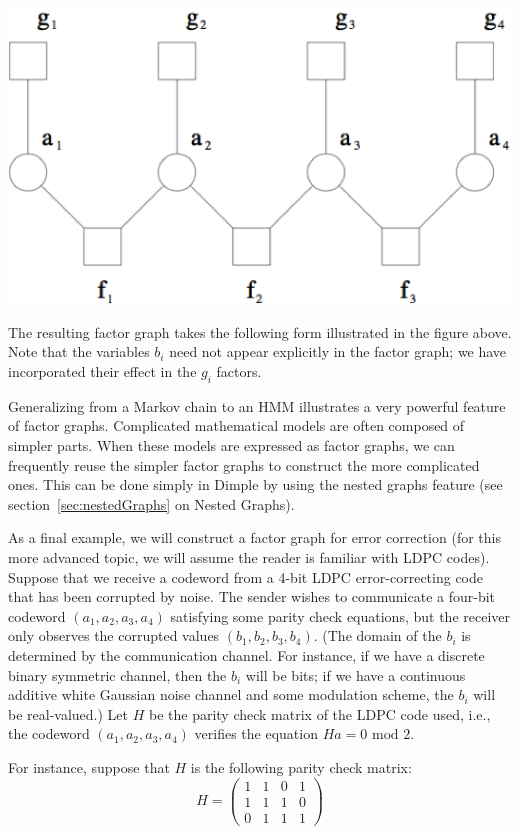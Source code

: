 \includegraphics{images/HMMExample.png}

The resulting factor graph takes the following form illustrated in the figure above. Note 
that the variables $b_i$  need not appear explicitly in the factor graph; we have incorporated their effect in the $g_i$  factors.

Generalizing from a Markov chain to an HMM illustrates a very powerful feature of factor graphs.  Complicated mathematical models are often composed of simpler parts.  When these models are expressed as factor graphs, we can frequently reuse the simpler factor graphs to construct the more complicated ones.  This can be done simply in Dimple by using the nested graphs feature (see section~\ref{sec:nestedGraphs} on Nested Graphs).

As a final example, we will construct a factor graph for error correction (for this
 more advanced topic, we will assume the reader is familiar with LDPC codes).  Suppose
 that we receive a codeword from a 4-bit LDPC error-correcting code that has been corrupted by noise.  
The sender wishes to communicate a four-bit codeword $(a_{1},a_{2},a_{3},a_{4})$ satisfying some parity check equations, 
but the receiver only observes the corrupted values $(b_{1},b_{2},b_{3},b_{4})$. (The domain of the $b_{i}$ is determined by the 
communication channel.  For instance, if we have a discrete binary symmetric channel, then the $b_{i}$ will be bits; 
if we have a continuous additive white Gaussian noise channel and some modulation scheme, the $b_{i}$  will be real-valued.) 
Let $H$ be the parity check matrix of the LDPC code used, i.e., the codeword $(a_{1},a_{2},a_{3},a_{4})$ verifies the equation $Ha=0 \textrm{ mod } 2$.

For instance, suppose that $H$ is the following parity check matrix:
%
\[
H = \left( \begin{array}{cccc}
1 & 1 & 0 & 1 \\
1 & 1 & 1 & 0 \\
0 & 1 & 1 & 1 \end{array} \right) 
\]

